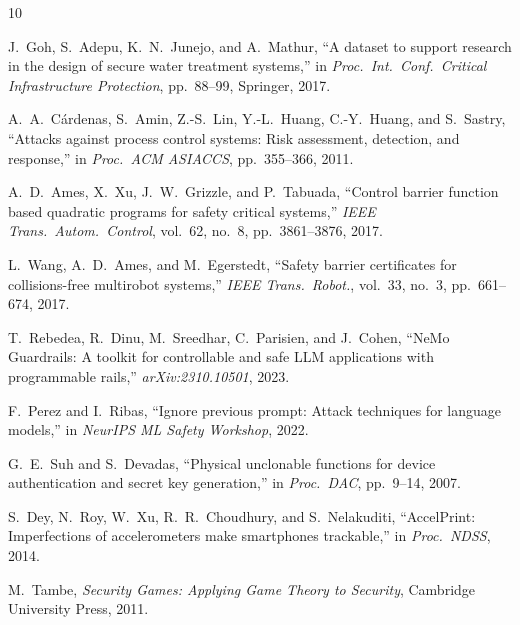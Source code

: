 \documentclass[journal]{IEEEtran}
\begin{document}
\begin{thebibliography}{10}

J.~Goh, S.~Adepu, K.~N.~Junejo, and A.~Mathur,
``A dataset to support research in the design of secure water treatment systems,''
in \emph{Proc.\ Int.\ Conf.\ Critical Infrastructure Protection}, pp.\ 88--99, Springer, 2017.

A.~A.~C\'ardenas, S.~Amin, Z.-S.~Lin, Y.-L.~Huang, C.-Y.~Huang, and S.~Sastry,
``Attacks against process control systems: Risk assessment, detection, and response,''
in \emph{Proc.\ ACM ASIACCS}, pp.\ 355--366, 2011.

A.~D.~Ames, X.~Xu, J.~W.~Grizzle, and P.~Tabuada,
``Control barrier function based quadratic programs for safety critical systems,''
\emph{IEEE Trans.\ Autom.\ Control}, vol.~62, no.~8, pp.\ 3861--3876, 2017.

L.~Wang, A.~D.~Ames, and M.~Egerstedt,
``Safety barrier certificates for collisions-free multirobot systems,''
\emph{IEEE Trans.\ Robot.}, vol.~33, no.~3, pp.\ 661--674, 2017.

T.~Rebedea, R.~Dinu, M.~Sreedhar, C.~Parisien, and J.~Cohen,
``NeMo Guardrails: A toolkit for controllable and safe LLM applications with programmable rails,''
\emph{arXiv:2310.10501}, 2023.

F.~Perez and I.~Ribas,
``Ignore previous prompt: Attack techniques for language models,''
in \emph{NeurIPS ML Safety Workshop}, 2022.

G.~E.~Suh and S.~Devadas,
``Physical unclonable functions for device authentication and secret key generation,''
in \emph{Proc.\ DAC}, pp.\ 9--14, 2007.

S.~Dey, N.~Roy, W.~Xu, R.~R.~Choudhury, and S.~Nelakuditi,
``AccelPrint: Imperfections of accelerometers make smartphones trackable,''
in \emph{Proc.\ NDSS}, 2014.

M.~Tambe,
\emph{Security Games: Applying Game Theory to Security},
Cambridge University Press, 2011.

\end{thebibliography}
\end{document}
